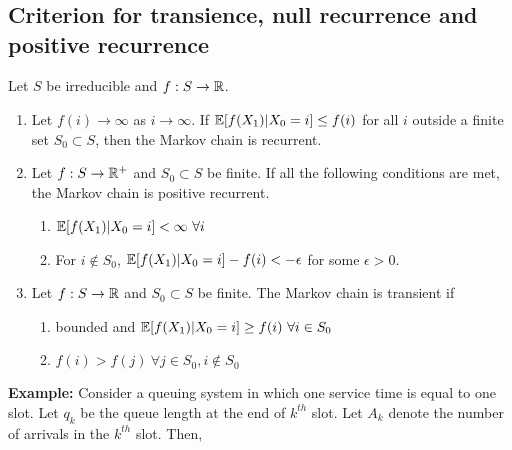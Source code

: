 \documentclass[all-lectures.tex]{subfiles}
\begin{document}

\setcounter{section}{3}
\setcounter{subsection}{0}

\section*{}
\subsection{Criterion for transience, null recurrence and positive recurrence}
\begin{prop} \label{prop:markov_chain_class_tests}
Let $S$ be irreducible and $f: S \rightarrow \mathbb{R}$. 
\begin{enumerate}
\item Let $f(i)\rightarrow \infty$ as $i\rightarrow \infty$. If $\mathbb{E}[f(X_1)|X_0 = i] \leq f(i)$ for all $i$ outside a finite set $S_0 \subset S$, then the Markov chain is recurrent. 
\item Let $f:S\rightarrow \mathbb{R}^+$ and $S_0 \subset S$ be finite. If all the following conditions are met, the Markov chain is positive recurrent. 
	\begin{enumerate}
	\item  $\E[f(X_1)|X_0 = i] < \infty \ \forall i$
	\item For $i \notin S_0$, $\mathbb{E}[f(X_1)|X_0 = i] - f(i) < -\epsilon$ for some $\epsilon > 0$.
	\end{enumerate}
\item Let $f:S\rightarrow \mathbb{R}$ and $S_0 \subset S$ be finite.	The Markov chain is transient if
	\begin{enumerate}
	\item  bounded and $\mathbb{E}[f(X_1)|X_0= i] \geq f(i)\ \forall i \in S_0$
	\item $f(i) > f(j)\ \forall j\in S_0, i\notin S_0$
	\end{enumerate}	
\end{enumerate}
\end{prop}
\textbf{Example:} Consider a queuing system in which one service time is equal to one slot. Let $q_k$ be the queue length at the end of $k^{th}$ slot. Let $A_k$ denote the number of arrivals in the $k^{th}$ slot. Then, 
\end{document}
